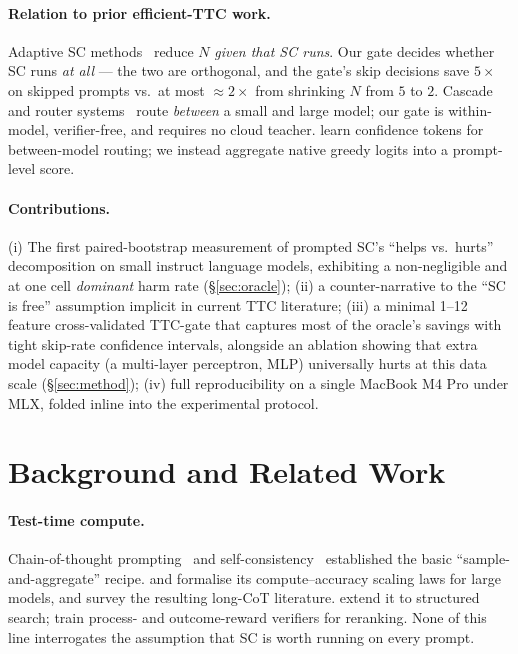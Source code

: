 \documentclass[11pt]{article}
\begin{document}
\paragraph{Relation to prior efficient-TTC work.}
Adaptive SC methods~\citep{Aggarwal2023AdaptiveConsistency,
Wan2024RASC,Aghazadeh2025CGES,Kim2026ReASC,Ji2025SeerSC,
Zhou2025RPC,Cordero2025Certified,Liu2026PETS} reduce $N$
\emph{given that SC runs}. Our gate decides whether SC runs \emph{at
all} --- the two are orthogonal, and the gate's skip decisions save
$5\times$ on skipped prompts vs.\ at most $\approx 2\times$ from
shrinking $N$ from $5$ to $2$. Cascade and router
systems~\citep{Zheng2025CITER,She2025TokenRouter,Ong2024RouteLLM,
Chen2024FrugalGPT} route \emph{between} a small and large model; our
gate is within-model, verifier-free, and requires no cloud teacher.
\citet{Chuang2024ConfidenceRoute} learn confidence tokens for
between-model routing; we instead aggregate native greedy logits
into a prompt-level score.

\paragraph{Contributions.}
(i) The first paired-bootstrap measurement of prompted SC's
``helps vs.\ hurts'' decomposition on small instruct language
models, exhibiting a
non-negligible and at one cell \emph{dominant} harm rate
(\S\ref{sec:oracle}); (ii) a counter-narrative to the ``SC is free''
assumption implicit in current TTC literature; (iii) a minimal
1--12 feature cross-validated TTC-gate that captures most of the
oracle's savings with tight skip-rate confidence intervals, alongside
an ablation showing that extra model capacity (a multi-layer
perceptron, MLP) universally hurts at this data scale
(\S\ref{sec:method}); (iv) full reproducibility on a
single MacBook M4 Pro under MLX, folded inline into the experimental
protocol.

\section{Background and Related Work}
\label{sec:related}

\paragraph{Test-time compute.}
Chain-of-thought prompting~\citep{Wei2022CoT,Kojima2022ZeroShotCoT}
and self-consistency~\citep{Wang2023SC} established the basic
``sample-and-aggregate'' recipe. \citet{Snell2024TTC} and
\citet{Chen2024Escape} formalise its compute--accuracy scaling laws
for large models, and \citet{Chen2025LongCoTSurvey} survey the
resulting long-CoT literature. \citet{Yao2023ToT} extend it to
structured search; \citet{Lightman2023LetsVerify,
Cobbe2021Verifiers} train process- and outcome-reward verifiers for
reranking. None of this line interrogates the assumption that SC is
worth running on every prompt.
\end{document}
